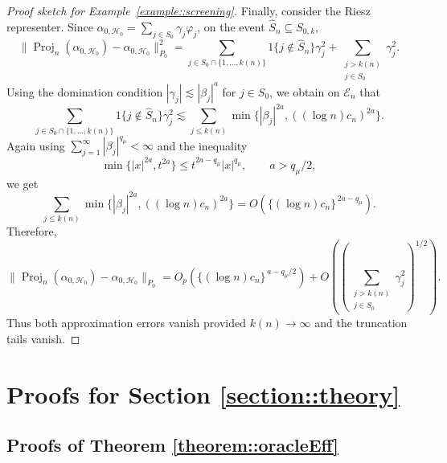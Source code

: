 \documentclass[11pt]{article}
\theoremstyle{definition}
\begin{document}
\begin{proof}[Proof sketch for Example~\ref{example::screening}]
Finally, consider the Riesz representer. Since
\(\alpha_{0,\mathcal H_0}=\sum_{j\in S_0}\gamma_j\varphi_j\), on the event
\(\widehat S_n\subseteq S_{0,k}\),
\[
\|\operatorname{Proj}_n(\alpha_{0,\mathcal H_0})
-\alpha_{0,\mathcal H_0}\|_{P_0}^2
=
\sum_{j\in S_0\cap\{1,\ldots,k(n)\}}
1\{j\notin \widehat S_n\}\gamma_j^2
+
\sum_{\substack{j>k(n)\\ j\in S_0}}\gamma_j^2 .
\]
Using the domination condition
\(|\gamma_j|\lesssim |\beta_j|^a\) for \(j\in S_0\), we obtain on
\(\mathcal E_n\) that
\[
\sum_{j\in S_0\cap\{1,\ldots,k(n)\}}
1\{j\notin \widehat S_n\}\gamma_j^2
\lesssim
\sum_{j\le k(n)} \min\{|\beta_j|^{2a},((\log n)c_n)^{2a}\}.
\]
Again using \(\sum_{j=1}^\infty |\beta_j|^{q_\mu}<\infty\) and the inequality
\[
\min\{|x|^{2a},t^{2a}\}\le t^{2a-q_\mu}|x|^{q_\mu},
\qquad a>q_\mu/2,
\]
we get
\[
\sum_{j\le k(n)} \min\{|\beta_j|^{2a},((\log n)c_n)^{2a}\}
=
O\!\left(\{(\log n)c_n\}^{\,2a-q_\mu}\right).
\]
Therefore,
\[
\|\operatorname{Proj}_n(\alpha_{0,\mathcal H_0})
-\alpha_{0,\mathcal H_0}\|_{P_0}
=
O_p\!\left(\{(\log n)c_n\}^{\,a-q_\mu/2}\right)
+
O\!\left(\left(\sum_{\substack{j>k(n)\\ j\in S_0}}\gamma_j^2\right)^{1/2}\right).
\]
Thus both approximation errors vanish provided \(k(n)\to\infty\) and the
truncation tails vanish.
\end{proof}



\section{Proofs for Section \ref{section::theory}}

\subsection{Proofs of Theorem  \ref{theorem::oracleEff} }

 
 
\end{document}
